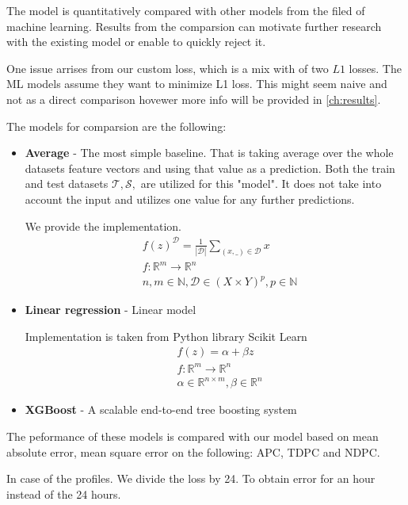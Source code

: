 The model is quantitatively compared with other models from the filed of machine learning. Results from the comparsion can motivate further research with the existing model or enable to quickly reject it.

One issue arrises from our custom loss, which is a mix with of two $L1$ losses. The ML models assume they want to minimize L1 loss. This might seem naive and not as a direct comparison hovewer more info will be provided in \ref{ch:results}.

The models for comparsion are the following:

\begin{itemize}
    \item \textbf{Average} - The most simple baseline. That is taking average over the whole datasets feature vectors and using that value as a prediction. Both the train and test datasets $\mathcal{T},\mathcal{S},$ are utilized for this "model". It does not take into account the input and utilizes one value for any further predictions.

          We provide the implementation.
          \begin{equation}
              \begin{split}
                   & f(z)^{\mathcal{D}}  = \frac{1}{|\mathcal{D}|} \sum_{(x,\_) \in \mathcal{D}} x \\
                   & f: \mathbb{R}^m \rightarrow \mathbb{R}^n                                      \\
                   & n,m \in \mathbb{N}, \mathcal{D} \in  (X \times Y)^p, p \in \mathbb{N}
              \end{split}
          \end{equation}


    \item \textbf{Linear regression} - Linear model

          Implementation is taken from Python library Scikit Learn 
          \begin{equation}
              \begin{split}
                   & f(z) = \alpha  + \beta z                                   \\
                   & f: \mathbb{R}^m \rightarrow \mathbb{R}^n                   \\
                   & \alpha \in \mathbb{R}^{n \times m}, \beta \in \mathbb{R}^n
              \end{split}
          \end{equation}
    \item \textbf{XGBoost} - A scalable end-to-end tree boosting system 
\end{itemize}

The peformance of these models is compared with our model based on mean absolute error, mean square error on the following: \acrlong{APC}, \acrlong{TDPC} and \acrlong{NDPC}.

In case of the profiles. We divide the loss by 24. To obtain error for an hour instead of the 24 hours.
